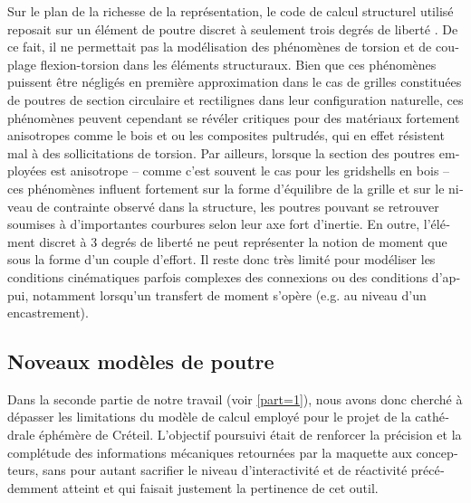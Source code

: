\begin{otherlanguage}{french}
Sur le plan de la richesse de la représentation, le code de calcul structurel utilisé reposait sur un élément de poutre discret à seulement trois degrés de liberté \cite{Adriaenssens2000}. De ce fait, il ne permettait pas la modélisation des phénomènes de torsion et de couplage flexion-torsion dans les éléments structuraux. Bien que ces phénomènes puissent être négligés en première approximation dans le cas de grilles constituées de poutres de section circulaire et rectilignes dans leur configuration naturelle, ces phénomènes peuvent cependant se révéler critiques pour des matériaux fortement anisotropes comme le bois et ou les composites pultrudés, qui en effet résistent mal à des sollicitations de torsion. Par ailleurs, lorsque la section des poutres employées est anisotrope -- comme c'est souvent le cas pour les gridshells en bois -- ces phénomènes influent fortement sur la forme d'équilibre de la grille et sur le niveau de contrainte observé dans la structure, les poutres pouvant se retrouver soumises à d'importantes courbures selon leur axe fort d'inertie. En outre, l'élément discret à 3 degrés de liberté ne peut représenter la notion de moment que sous la forme d'un couple d'effort. Il reste donc très limité pour modéliser les conditions cinématiques parfois complexes des connexions ou des conditions d'appui, notamment lorsqu'un transfert de moment s'opère (e.g. au niveau d'un encastrement).

\subsection*{Noveaux modèles de poutre}

Dans la seconde partie de notre travail (voir \cref{part=1}), nous avons donc cherché à dépasser les limitations du modèle de calcul employé pour le projet de la cathédrale éphémère de Créteil. L'objectif poursuivi était de renforcer la précision et la complétude des informations mécaniques retournées par la maquette aux concepteurs, sans pour autant sacrifier le niveau d'interactivité et de réactivité précédemment atteint et qui faisait justement la pertinence de cet outil.


\end{otherlanguage}
